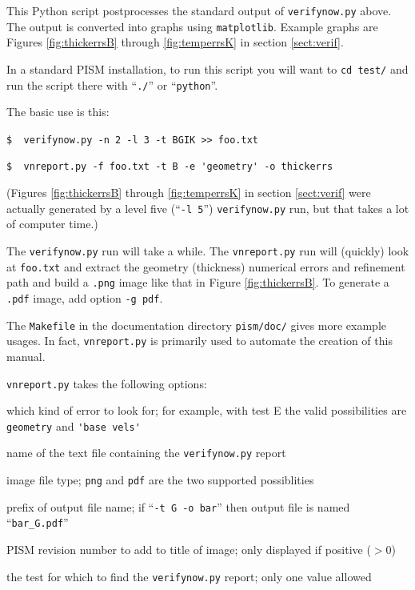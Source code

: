 \documentclass[11pt,final]{amsart}
\begin{document}
  This Python script postprocesses the standard output of \verb|verifynow.py| above.  The output is converted into graphs using \verb|matplotlib|.  Example graphs are Figures \ref{fig:thickerrsB} through \ref{fig:temperrsK} in section \ref{sect:verif}.

In a standard PISM installation, to run this script you will want to \verb|cd test/| and run the script there with ``\verb|./|'' or ``\verb|python|''.

The basic use is this:

\verb|$  verifynow.py -n 2 -l 3 -t BGIK >> foo.txt|

\verb|$  vnreport.py -f foo.txt -t B -e 'geometry' -o thickerrs|

\noindent (Figures \ref{fig:thickerrsB} through \ref{fig:temperrsK} in section \ref{sect:verif} were actually generated by a level five (``\verb|-l 5|'') \verb|verifynow.py| run, but that takes a lot of computer time.)

The \verb|verifynow.py| run will take a while.  The \verb|vnreport.py| run will (quickly) look at \verb|foo.txt| and extract the geometry (thickness) numerical errors and refinement path and build a \verb|.png| image like that in Figure \ref{fig:thickerrsB}.  To generate a \verb|.pdf| image, add option \verb|-g pdf|.

The \verb|Makefile| in the documentation directory \verb|pism/doc/| gives more example usages.  In fact, \verb|vnreport.py| is primarily used to automate the creation of this manual.

\opthead  \verb|vnreport.py| takes the following options:

 which kind of error to look for; for example, with test E the valid possibilities are \verb|geometry| and \verb|'base vels'|

 name of the text file containing the \verb|verifynow.py| report

 image file type; \verb|png| and \verb|pdf| are the two supported possiblities

 prefix of output file name; if ``\verb|-t G -o bar|'' then output file is named ``\verb|bar_G.pdf|''

 PISM revision number to add to title of image; only displayed if positive ($>0$)

 the test for which to find the \verb|verifynow.py| report; only one value allowed
\end{document}
